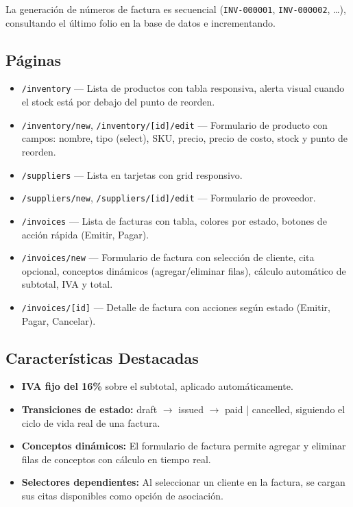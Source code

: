 \documentclass[12pt,a4paper]{article}
\begin{document}
La generación de números de factura es secuencial (\texttt{INV-000001},
\texttt{INV-000002}, \dots), consultando el último folio en la base de datos
e incrementando.

\subsection{Páginas}

\begin{itemize}[leftmargin=*]
    \item \texttt{/inventory} --- Lista de productos con tabla responsiva, alerta
          visual cuando el stock está por debajo del punto de reorden.
    \item \texttt{/inventory/new}, \texttt{/inventory/[id]/edit} --- Formulario
          de producto con campos: nombre, tipo (select), SKU, precio, precio de costo,
          stock y punto de reorden.
    \item \texttt{/suppliers} --- Lista en tarjetas con grid responsivo.
    \item \texttt{/suppliers/new}, \texttt{/suppliers/[id]/edit} --- Formulario
          de proveedor.
    \item \texttt{/invoices} --- Lista de facturas con tabla, colores por estado,
          botones de acción rápida (Emitir, Pagar).
    \item \texttt{/invoices/new} --- Formulario de factura con selección de
          cliente, cita opcional, conceptos dinámicos (agregar/eliminar filas),
          cálculo automático de subtotal, IVA y total.
    \item \texttt{/invoices/[id]} --- Detalle de factura con acciones según
          estado (Emitir, Pagar, Cancelar).
\end{itemize}

\subsection{Características Destacadas}

\begin{itemize}[leftmargin=*]
    \item \textbf{IVA fijo del 16\%} sobre el subtotal, aplicado automáticamente.
    \item \textbf{Transiciones de estado:} draft $\to$ issued $\to$ paid |
          cancelled, siguiendo el ciclo de vida real de una factura.
    \item \textbf{Conceptos dinámicos:} El formulario de factura permite agregar
          y eliminar filas de conceptos con cálculo en tiempo real.
    \item \textbf{Selectores dependientes:} Al seleccionar un cliente en la
          factura, se cargan sus citas disponibles como opción de asociación.
\end{itemize}
\end{document}
